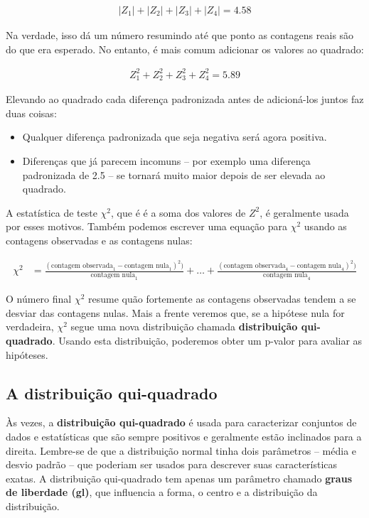 \documentclass[
]{book}
\theoremstyle{definition}
\theoremstyle{definition}
\theoremstyle{definition}
\theoremstyle{definition}
\theoremstyle{remark}
\begin{document}
\begin{align*}
|Z_1| + |Z_2| + |Z_3| + |Z_4| = 4.58
\end{align*}

Na verdade, isso dá um número resumindo até que ponto as contagens reais são do que era esperado. No entanto, é mais comum adicionar os valores ao quadrado:

\begin{align*}
Z_1^2 + Z_2^2 + Z_3^2 + Z_4^2 = 5.89
\end{align*}

Elevando ao quadrado cada diferença padronizada antes de adicioná-los juntos faz duas coisas:

\begin{itemize}
\item
  Qualquer diferença padronizada que seja negativa será agora positiva.
\item
  Diferenças que já parecem incomuns -- por exemplo uma diferença padronizada de 2.5 -- se tornará muito maior depois de ser elevada ao quadrado.
\end{itemize}

A estatística de teste \(\chi^2\), que é é a soma dos valores de \(Z^2\), é geralmente usada por esses motivos. Também podemos escrever uma equação para \(\chi^2\) usando as contagens observadas e as contagens nulas:

\begin{align*}
\chi^2 &=
  \frac{(\text{contagem observada}_1 - \text{contagem nula}_1)^2)}{\text{contagem nula}_1} + \dots + \frac{(\text{contagem observada}_4 - \text{contagem nula}_4)^2)}{\text{contagem nula}_4}
\end{align*}

O número final \(\chi^2\) resume quão fortemente as contagens observadas tendem a se desviar das contagens nulas. Mais a frente veremos que, se a hipótese nula for verdadeira, \(\chi^2\) segue uma nova distribuição chamada \textbf{distribuição qui-quadrado}. Usando esta distribuição, poderemos obter um p-valor para avaliar as hipóteses.

\hypertarget{chiSquareDistribution}{%
\subsection{A distribuição qui-quadrado}\label{chiSquareDistribution}}

Às vezes, a \textbf{distribuição qui-quadrado} é usada para caracterizar conjuntos de dados e estatísticas que são sempre positivos e geralmente estão inclinados para a direita. Lembre-se de que a distribuição normal tinha dois parâmetros -- média e desvio padrão -- que poderiam ser usados para descrever suas características exatas. A distribuição qui-quadrado tem apenas um parâmetro chamado \textbf{graus de liberdade (gl)}, que influencia a forma, o centro e a distribuição da distribuição.
\end{document}
